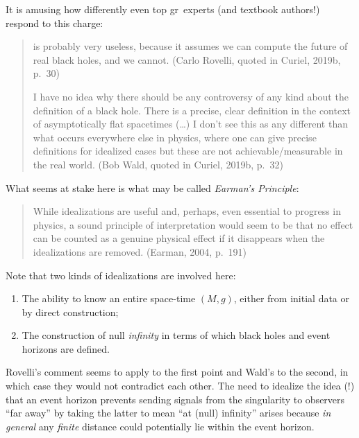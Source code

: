 \documentclass[11pt,a4paper]{article}
\newcommand{\GR}{{\sc gr}}
\begin{document}
It is amusing how differently even top \GR\ experts (and textbook authors!) respond to this charge:
 \begin{quote}
\begin{small}
 is probably very useless, because it assumes we can compute the future of real black holes, and we cannot. (Carlo Rovelli, quoted in Curiel, 2019b, p.\ 30)

I have no idea why there should be any controversy of any kind about the definition of a black hole. There is a precise, clear definition in the context of asymptotically flat spacetimes (\ldots) I don't see this as any different than what occurs everywhere else in physics, where one can give precise definitions for idealized cases but these are not achievable/measurable in the real world. (Bob Wald, quoted in Curiel, 2019b, p.\ 32)
\end{small}
\end{quote}
What seems at stake here is what may be called  
 \emph{Earman's Principle}:
  \begin{quote}
\begin{small}
While idealizations are useful and, perhaps, even essential to progress in physics, a sound principle of interpretation would seem to be that no effect  can be counted as  a genuine physical effect if it disappears
when the idealizations are removed. (Earman, 2004, p.\ 191)
\end{small}
\end{quote}
Note that two kinds of idealizations are involved here:
\begin{enumerate}
\item The ability to know an entire space-time $(M,g)$, either from initial data or by direct construction;
\item The  construction of null \emph{infinity} in terms of which  black holes and  event horizons are defined.
\end{enumerate}
Rovelli's comment seems to apply to the first point and Wald's to the second, in which case  they would not  contradict each other. The need to idealize the idea (!) that an event horizon prevents sending signals from the singularity to observers ``far away'' by taking the latter to mean ``at (null) infinity'' arises because \emph{in general} any \emph{finite} distance could potentially lie within the event horizon.
\end{document}
